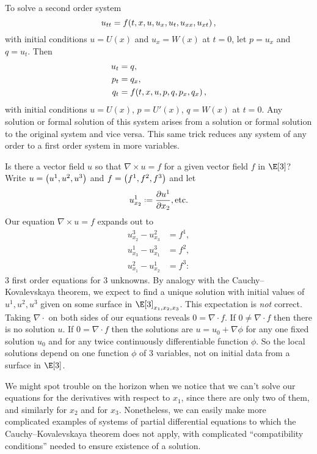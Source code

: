 To solve a second order system \[u_{tt}=f\!\left(t,x,u,u_x,u_t,u_{xx},u_{xt}\right),\] with initial conditions \(u=U(x)\) and \(u_x=W(x)\) at \(t=0\), let \(p=u_x\) and \(q=u_t\).
Then
\begin{align*}
u_t &= q, \\
p_t &= q_x, \\
q_t &= f\!\left(t,x,u,p,q,p_x,q_x\right),
\end{align*}
with initial conditions \(u=U(x)\), \(p=U'(x)\), \(q=W(x)\) at \(t=0\).
Any solution or formal solution of this system arises from a solution or formal solution to the original system and vice versa.
This same trick reduces any system of any order to a first order system in more variables.
\begin{example}
Is there a vector field \(u\) so that \(\nabla \times u = f\) for a given vector field \(f\) in \(\E[3]\)?
Write \(u=\left(u^1,u^2,u^3\right)\) and \(f=\left(f^1,f^2,f^3\right)\) and let
\[
u^1_{x_2} \defeq \pderiv{u^1}{x_2}, \text{etc}.
\]
Our equation \(\nabla \times u = f\) expands out to
\begin{align*}
u^3_{x_2}-u^2_{x_3} &= f^1, \\
u^1_{x_3}-u^3_{x_1} &= f^2, \\
u^2_{x_1}-u^1_{x_2} &= f^3:
\end{align*}
\(3\) first order equations for \(3\) unknowns.
By analogy with the Cauchy--Kovalevskaya theorem, we expect to find a unique solution with initial values of \(u^1, u^2, u^3\) given on some surface in \(\E[3]_{x_1, x_2, x_3}\).
This expectation is \emph{not} correct.
Taking \(\nabla \cdot\) on both sides of our equations reveals \(0=\nabla \cdot f\).
If \(0\ne \nabla \cdot f\) then there is no solution \(u\).
If \(0=\nabla \cdot f\) then the solutions are \(u=u_0 + \nabla \phi\) 
for any one fixed solution \(u_0\) and for any twice continuously differentiable function \(\phi\).
So the local solutions depend on one function \(\phi\) of \(3\) variables, not on initial data from a surface in \(\E[3]\).

We might spot trouble on the horizon when we notice that we can't solve our equations for the derivatives with respect to \(x_1\), since there are only two of them, and similarly for \(x_2\) and for \(x_3\).
Nonetheless, we can easily make more complicated examples of systems of partial differential equations to which the Cauchy--Kovalevskaya theorem does not apply, with complicated ``compatibility conditions'' needed to ensure existence of a solution.
\end{example}

